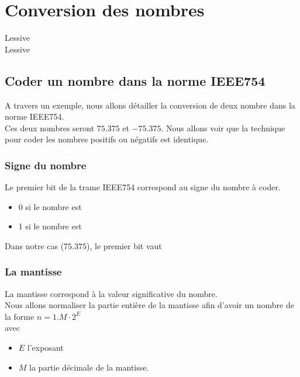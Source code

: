 \chapter{Conversion des nombres}     

{\faCheckCircle} Lessive \\
{\faCheckCircle} Lessive \\



\section{Coder un nombre dans la norme IEEE754}

A travers un exemple, nous allons détailler la conversion de deux nombre dans la norme IEEE754. \\
Ces deux nombres seront $75.375$ et $-75.375$. Nous allons voir que la technique pour coder les nombres positifs ou négatifs est identique.

\subsection{Signe du nombre}

Le premier bit de la trame IEEE754 correspond au signe du nombre à coder.

\begin{itemize}
	\item 0 si le nombre est 
	\item 1 si le nombre est 

\end{itemize}

Dans notre cas ($75.375$), le premier bit vaut 

\subsection{La mantisse}

La mantisse correspond à la valeur significative du nombre. \\ 
Nous allons normaliser la partie entière de la mantisse afin d'avoir un nombre de la forme $n = 1.M \cdot 2^E$ \\

avec 
\begin{itemize}

\item $E$ l'exposant
\item $M$ la partie décimale de la mantisse.
\end{itemize}



